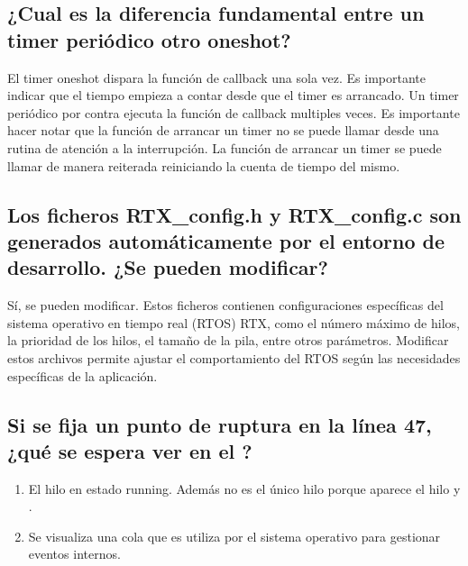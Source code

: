 \documentclass[letterpaper,10pt,english]{sphinxmanual}
\begin{document}
\subsection{¿Cual es la diferencia fundamental entre un timer periódico otro one\sphinxhyphen{}shot?}
\label{\detokenize{ejemplothreads-software-timers:cual-es-la-diferencia-fundamental-entre-un-timer-periodico-otro-one-shot}}
\sphinxAtStartPar
El timer one\sphinxhyphen{}shot dispara la función de callback una sola vez. Es importante indicar que el tiempo empieza a contar desde que el timer es arrancado.
Un timer periódico por contra ejecuta la función de callback multiples veces.
Es importante hacer notar que la función de arrancar un timer no se puede llamar desde una rutina de atención a la interrupción.
La función de arrancar un timer se puede llamar de manera reiterada reiniciando la cuenta de tiempo del mismo.


\subsection{Los ficheros RTX\_config.h y RTX\_config.c son generados automáticamente por el entorno de desarrollo. ¿Se pueden modificar?}
\label{\detokenize{ejemplothreads-software-timers:los-ficheros-rtx-config-h-y-rtx-config-c-son-generados-automaticamente-por-el-entorno-de-desarrollo-se-pueden-modificar}}
\sphinxAtStartPar
Sí, se pueden modificar. Estos ficheros contienen configuraciones específicas del sistema operativo en tiempo real (RTOS) RTX, como el número máximo de hilos, la prioridad de los hilos, el tamaño de la pila, entre otros parámetros.
Modificar estos archivos permite ajustar el comportamiento del RTOS según las necesidades específicas de la aplicación.


\subsection{Si se fija un punto de ruptura en la línea 47, ¿qué se espera ver en el ?}
\label{\detokenize{ejemplothreads-software-timers:si-se-fija-un-punto-de-ruptura-en-la-linea-47-que-se-espera-ver-en-el-watch-windows-rtx-rtos}}\begin{enumerate}
%
\item {} 
\sphinxAtStartPar
El hilo en estado running. Además no es el único hilo porque aparece el hilo  y .

\item {} 
\sphinxAtStartPar
Se visualiza una cola que es utiliza por el sistema operativo para gestionar eventos internos.

\end{enumerate}
\end{document}
